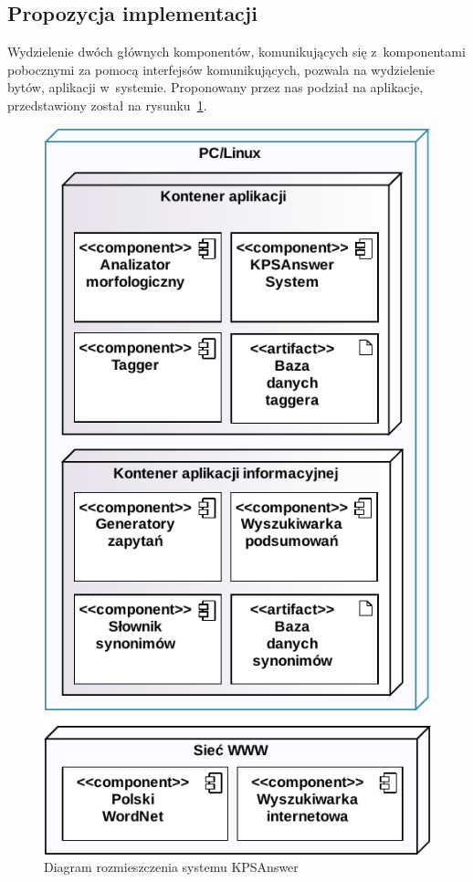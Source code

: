 \subsection{Propozycja implementacji}
Wydzielenie dwóch głównych komponentów, komunikujących się z~komponentami pobocznymi za pomocą interfejsów komunikujących, pozwala na wydzielenie bytów, aplikacji w~systemie. Proponowany przez nas podział na aplikacje, przedstawiony został na rysunku~\ref{fig:system-deployment}.

\begin{figure}[h!]
    \centering
    \includegraphics[width=0.8\columnwidth]{figures/WEDT-Deployment.pdf}
    \caption{Diagram rozmieszczenia systemu KPSAnswer}
    \label{fig:system-deployment}
\end{figure}

